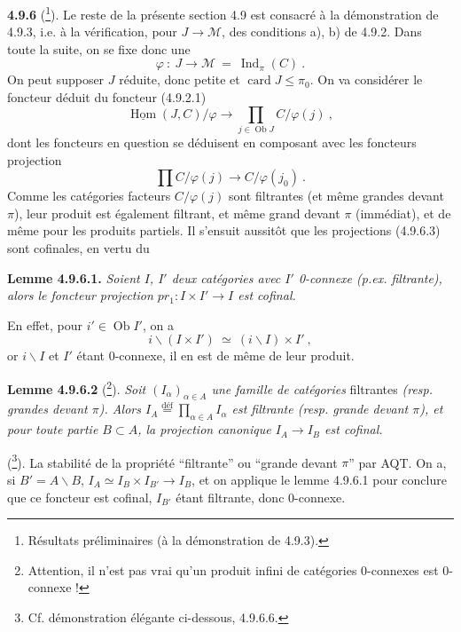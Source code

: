 \documentclass[11pt]{article}
\newcommand{\printedpage}[1]{\marginpar{\footnotesize p.~#1}}
\newcommand{\msp}[1]{\marginpar{\footnotesize [#1]}}
\newcommand{\card}{\operatorname{card}}
\newcommand{\Ob}{\operatorname{Ob}}
\newcommand{\Ind}{\operatorname{Ind}}
\newcommand{\uHom}{\underline{\operatorname{Hom}}}
\newcommand{\cM}{\mathcal{M}}
\begin{document}
\printedpage{80}

\textbf{4.9.6} (\footnote[96]{Résultats préliminaires (à la démonstration de 4.9.3).}). Le reste de la présente section 4.9 est consacré à la démonstration de 4.9.3, i.e. à la vérification, pour $J \longrightarrow \cM$, des conditions a), b) de 4.9.2. Dans toute la suite, on se fixe donc une
\[
\varphi \ : \ J \longrightarrow \cM \ = \ \Ind_\pi(C) \ . \tag*{(4.9.6.1)}
\]
On peut supposer $J$ réduite, donc petite et $\card J \leqslant \pi_0$. On va considérer le foncteur déduit du foncteur (4.9.2.1)
\[
\uHom(J,C)/\varphi \longrightarrow \prod_{j \in \Ob J} C/\varphi(j) \ , \tag*{(4.9.6.2)}
\]
dont les foncteurs en question se déduisent en composant avec les foncteurs projection
\[
\prod C/\varphi(j) \longrightarrow C/\varphi(j_0) \ . \tag*{(4.9.6.3)}
\]
Comme les catégories facteurs $C/\varphi(j)$ sont filtrantes (et même grandes devant $\pi$), leur produit est également filtrant, et même grand devant $\pi$ (immédiat), et de même
\msp{page 222}
pour les produits partiels. Il s'ensuit aussitôt que les projections (4.9.6.3) sont cofinales, en vertu du

\textbf{Lemme 4.9.6.1.} \textit{Soient $I$, $I'$ deux catégories avec $I'$ \textup{0}-connexe (p.ex. filtrante), alors le foncteur projection $pr_1 : I \times I' \longrightarrow I$ est cofinal.}

En effet, pour $i' \in \Ob I'$, on a
\[
i\backslash(I \times I') \ \simeq \ (i\backslash I) \times I' \ ,
\]
or $i\backslash I$ et $I'$ étant 0-connexe, il en est de même de leur produit.

\textbf{Lemme 4.9.6.2} (\footnote[97]{Attention, il n'est pas vrai qu'un produit infini de catégories 0-connexes est 0-connexe !}). \textit{Soit $(I_\alpha)_{\alpha \in A}$ une famille de catégories} filtrantes \textit{(resp. grandes devant $\pi$). Alors $I_A \stackrel{\text{déf}}{=} \prod_{\alpha \in A} I_\alpha$ est filtrante (resp. grande devant $\pi$), et pour toute partie $B \subset A$, la projection canonique $I_A \longrightarrow I_B$ est cofinal.} %

(\footnote[98]{Cf. démonstration élégante ci-dessous, 4.9.6.6.}). La stabilité de la propriété “filtrante” ou “grande devant $\pi$” par AQT. On a, si $B' = A\backslash B$, $I_A \simeq I_B \times I_{B'} \longrightarrow I_B$, et on applique le lemme 4.9.6.1 pour conclure que ce foncteur est cofinal, $I_{B'}$ étant filtrante, donc 0-connexe.
\end{document}
